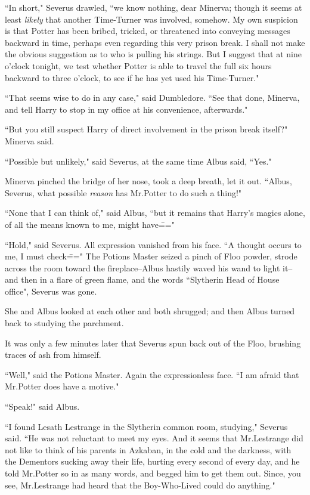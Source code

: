 ``In short," Severus drawled, ``we know nothing, dear Minerva; though it seems at least \emph{likely} that another Time-Turner was involved, somehow. My own suspicion is that Potter has been bribed, tricked, or threatened into conveying messages backward in time, perhaps even regarding this very prison break. I shall not make the obvious suggestion as to who is pulling his strings. But I suggest that at nine o'clock tonight, we test whether Potter is able to travel the full six hours backward to three o'clock, to see if he has yet used his Time-Turner."

``That seems wise to do in any case," said Dumbledore. ``See that done, Minerva, and tell Harry to stop in my office at his convenience, afterwards."

``But you still suspect Harry of direct involvement in the prison break itself?" Minerva said.

``Possible but unlikely," said Severus, at the same time Albus said, ``Yes."

Minerva pinched the bridge of her nose, took a deep breath, let it out. ``Albus, Severus, what possible \emph{reason} has Mr.\?Potter to do such a thing!"

``None that I can think of," said Albus, ``but it remains that Harry's magics alone, of all the means known to me, might have\==="

``Hold," said Severus. All expression vanished from his face. ``A thought occurs to me, I must check\===" The Potions Master seized a pinch of Floo powder, strode across the room toward the fireplace\---Albus hastily waved his wand to light it\---and then in a flare of green flame, and the words ``Slytherin Head of House office", Severus was gone.

She and Albus looked at each other and both shrugged; and then Albus turned back to studying the parchment.

It was only a few minutes later that Severus spun back out of the Floo, brushing traces of ash from himself.

``Well," said the Potions Master. Again the expressionless face. ``I am afraid that Mr.\?Potter does have a motive."

``Speak!" said Albus.

``I found Lesath Lestrange in the Slytherin common room, studying," Severus said. ``He was not reluctant to meet my eyes. And it seems that Mr.\?Lestrange did not like to think of his parents in Azkaban, in the cold and the darkness, with the Dementors sucking away their life, hurting every second of every day, and he told Mr.\?Potter so in as many words, and begged him to get them out. Since, you see, Mr.\?Lestrange had heard that the Boy-Who-Lived could do anything."

